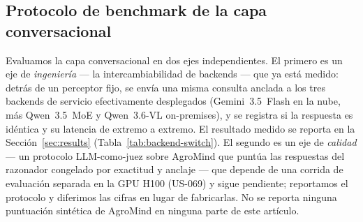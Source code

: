 \subsection{Protocolo de benchmark de la capa conversacional}
\label{sec:experiments-llm}
Evaluamos la capa conversacional en dos ejes independientes. El primero
es un eje de \emph{ingeniería} --- la intercambiabilidad de backends ---
que ya está medido: detrás de un perceptor fijo, se envía una misma
consulta anclada a los tres backends de servicio efectivamente
desplegados (Gemini~3.5~Flash en la nube, más Qwen~3.5~MoE y
Qwen~3.6-VL on-premises), y se registra si la respuesta es idéntica y su
latencia de extremo a extremo. El resultado medido se reporta en la
Sección~\ref{sec:results} (Tabla~\ref{tab:backend-switch}). El segundo es
un eje de \emph{calidad} --- un protocolo LLM-como-juez sobre AgroMind que
puntúa las respuestas del razonador congelado por exactitud y anclaje ---
que depende de una corrida de evaluación separada en la GPU H100 (US-069)
y sigue pendiente; reportamos el protocolo y diferimos las cifras en
lugar de fabricarlas. No se reporta ninguna puntuación sintética de
AgroMind en ninguna parte de este artículo.
